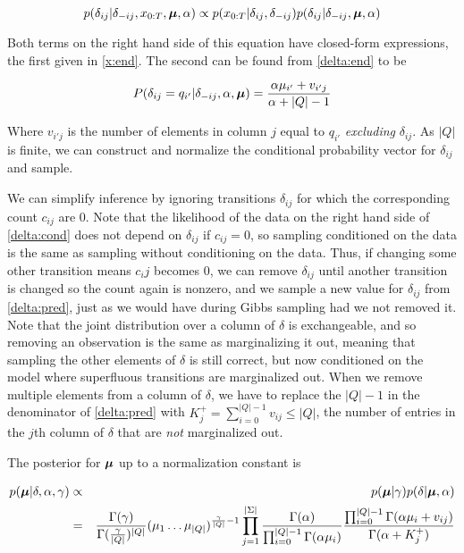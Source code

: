 \begin{equation}
p(\delta_{ij}|\delta_{-ij},x_{0:T},\bmu,\alpha) \propto p(x_{0:T}|\delta_{ij},\delta_{-ij})p(\delta_{ij}|\delta_{-ij},\bmu,\alpha) \label{delta:cond}
\end{equation}

Both terms on the right hand side of this equation have closed-form expressions, the first given in \eqref{x:end}.  The second can be found from \eqref{delta:end} to be

\begin{equation}
P(\delta_{ij} = q_{i'}|\delta_{-ij},\alpha,\bmu) = \frac{\alpha\mu_{i'} + v_{i'j}}{\alpha + |Q| - 1} \label{delta:pred}
\end{equation}

Where $v_{i'j}$ is the number of elements in column $j$ equal to $q_{i'}$ {\em excluding} $\delta_{ij}$.  As $|Q|$ is finite, we can construct and normalize the conditional probability vector for $\delta_{ij}$ and sample.

We can simplify inference by ignoring transitions $\delta_{ij}$ for which the corresponding count $c_{ij}$ are 0.  Note that the likelihood of the data on the right hand side of \eqref{delta:cond} does not depend on $\delta_{ij}$ if $c_{ij} = 0$, so sampling conditioned on the data is the same as sampling without conditioning on the data.  Thus, if changing some other transition means $c_ij$ becomes 0, we can remove $\delta_{ij}$ until another transition is changed so the count again is nonzero, and we sample a new value for $\delta_{ij}$ from \eqref{delta:pred}, just as we would have during Gibbs sampling had we not removed it.  Note that the joint distribution over a column of $\delta$ is exchangeable, and so removing an observation is the same as marginalizing it out, meaning that sampling the other elements of $\delta$ is still correct, but now conditioned on the model where superfluous transitions are marginalized out.  When we remove multiple elements from a column of $\delta$, we have to replace the $|Q| - 1$ in the denominator of \eqref{delta:pred} with $K^+_j = \sum_{i=0}^{|Q|-1}v_{ij} \leq |Q|$, the number of entries in the $j$th column of $\delta$ that are {\em not} marginalized out.

The posterior for $\bmu$ up to a normalization constant is

\begin{eqnarray}
p(\bmu|\delta,\alpha,\gamma) & \propto & p(\bmu|\gamma) p(\delta|\bmu,\alpha)\nonumber \\
& = & \frac{\Gamma(\gamma)}{\Gamma(\frac{\gamma}{|Q|})^{|Q|}}(\mu_1\ldots\mu_{|Q|})^{\frac{\gamma}{|Q|}-1}\prod_{j=1}^{|\Sigma|} \frac{\Gamma(\alpha)}{\prod_{i=0}^{|Q|-1}\Gamma(\alpha\mu_i)} \frac{\prod_{i=0}^{|Q|-1} \Gamma(\alpha\mu_i + v_{ij})}{\Gamma(\alpha + K^+_j)}
\end{eqnarray}


